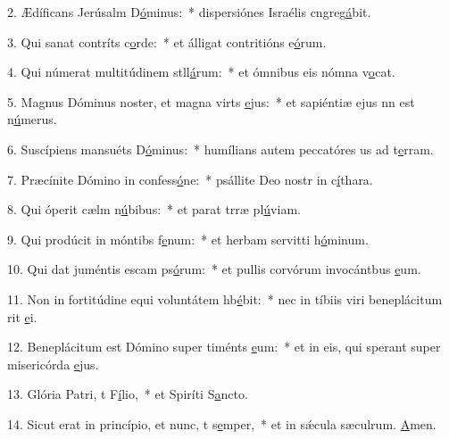 2. Ædíficans Jerúsalm D\uline{ó}minus:~* dispersiónes Israélis cngreg\uline{á}bit.\par 
3. Qui sanat contríts c\uline{o}rde:~* et álligat contritións e\uline{ó}rum.\par 
4. Qui númerat multitúdinem stll\uline{á}rum:~* et ómnibus eis nómna v\uline{o}cat.\par 
5. Magnus Dóminus noster, et magna virts \uline{e}jus:~* et sapiéntiæ ejus nn est n\uline{ú}merus.\par 
6. Suscípiens mansuéts D\uline{ó}minus:~* humílians autem peccatóres us ad t\uline{e}rram.\par 
7. Præcínite Dómino in confess\uline{ó}ne:~* psállite Deo nostr in c\uline{í}thara.\par 
8. Qui óperit cælm n\uline{ú}bibus:~* et parat trræ pl\uline{ú}viam.\par 
9. Qui prodúcit in móntibs f\uline{e}num:~* et herbam servitti h\uline{ó}minum.\par 
10. Qui dat juméntis escam ps\uline{ó}rum:~* et pullis corvórum invocántbus \uline{e}um.\par 
11. Non in fortitúdine equi voluntátem hb\uline{é}bit:~* nec in tíbiis viri beneplácitum rit \uline{e}i.\par 
12. Beneplácitum est Dómino super timénts \uline{e}um:~* et in eis, qui sperant super misericórda \uline{e}jus.\par 
13. Glória Patri, t F\uline{í}lio,~* et Spiríti S\uline{a}ncto.\par 
14. Sicut erat in princípio, et nunc, t s\uline{e}mper,~* et in sǽcula sæculrum. \uline{A}men.\par 
